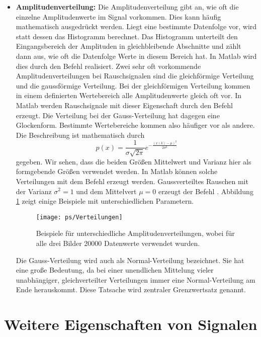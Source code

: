 \begin{itemize}
\item{{\bf Amplitudenverteilung:} Die Amplitudenverteilung gibt an, wie oft die einzelne Amplitudenwerte
im Signal vorkommen. Dies kann häufig mathematisch ausgedrückt werden. Liegt eine
bestimmte Datenfolge vor, wird statt dessen das Histogramm berechnet. Das Histogramm unterteilt den
Eingangsbereich der Amplituden in gleichbleibende Abschnitte und zählt dann aus, wie oft
die Datenfolge Werte in diesem Bereich hat. In Matlab wird dies durch den Befehl 
realisiert. Zwei sehr oft vorkommende Amplitudenverteilungen bei Rauschsignalen sind die
gleichförmige Verteilung und die gaussförmige Verteilung. Bei der gleichförmigen Verteilung
kommen in einem definierten Wertebereich alle Amplitudenwerte gleich oft vor. In Matlab
werden Rauschsignale mit dieser Eigenschaft durch den Befehl  erzeugt.
Die Verteilung bei der Gauss-Verteilung hat dagegen eine Glockenform. Bestimmte Wertebereiche kommen
also häufiger vor als andere. Die Beschreibung ist mathematisch durch
\begin{equation}
 p(x) = \frac{1}{\sigma \sqrt{2\pi}} e^{-\frac{(x(k)-\mu)^2}{2\sigma^2}}
\end{equation}
gegeben. Wir sehen, dass die beiden Größen Mittelwert und Varianz hier als formgebende Größen
verwendet werden. In Matlab können solche Verteilungen mit dem Befehl  erzeugt werden.
Gaussverteiltes Rauschen mit der Varianz $\sigma^2= 1$ und dem Mittelvert $\mu= 0$ erzeugt der
Befehl .
Abbildung \ref{pic:Verteilungen} zeigt einige Beispiele mit unterschiedlichen Parametern.
\begin{figure}[H]
\begin{center}
\texttt{[image: ps/Verteilungen]}
\caption{\label{pic:Verteilungen} Beispiele für unterschiedliche Amplitudenverteilungen, wobei
für alle drei Bilder 20000 Datenwerte verwendet wurden.}
\end{center}
\end{figure}
Die Gauss-Verteilung wird auch als Normal-Verteilung bezeichnet. Sie hat eine
große Bedeutung, da bei einer unendlichen Mittelung vieler unabhängiger, gleichverteilter
Verteilungen immer eine Normal-Verteilung am Ende herauskommt. Diese Tatsache wird
zentraler Grenzwertsatz genannt.
}
\end{itemize}

\section{Weitere Eigenschaften von Signalen}

